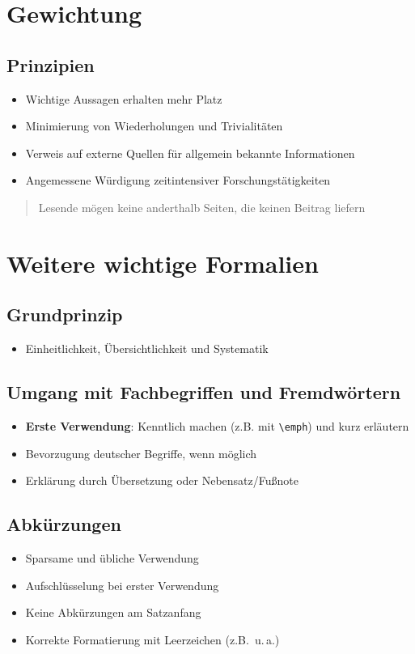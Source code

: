 \documentclass[12pt,a4paper,oneside]{article}
\begin{document}
\section{Gewichtung}

\subsection{Prinzipien}
\begin{itemize}
    \item Wichtige Aussagen erhalten mehr Platz
    \item Minimierung von Wiederholungen und Trivialitäten
    \item Verweis auf externe Quellen für allgemein bekannte Informationen
    \item Angemessene Würdigung zeitintensiver Forschungstätigkeiten
\end{itemize}

\begin{quote}
\glqq Lesende mögen keine anderthalb Seiten, die keinen Beitrag liefern\grqq{}
\end{quote}


\section{Weitere wichtige Formalien}

\subsection{Grundprinzip}
\begin{itemize}
    \item Einheitlichkeit, Übersichtlichkeit und Systematik
\end{itemize}

\subsection{Umgang mit Fachbegriffen und Fremdwörtern}
\begin{itemize}
    \item \textbf{Erste Verwendung}: Kenntlich machen (z.B. mit \verb|\emph|) und kurz erläutern
    \item Bevorzugung deutscher Begriffe, wenn möglich
    \item Erklärung durch Übersetzung oder Nebensatz/Fußnote
\end{itemize}

\subsection{Abkürzungen}
\begin{itemize}
    \item Sparsame und übliche Verwendung
    \item Aufschlüsselung bei erster Verwendung
    \item Keine Abkürzungen am Satzanfang
    \item Korrekte Formatierung mit Leerzeichen (z.B.~u.\,a.)
\end{itemize}
\end{document}
